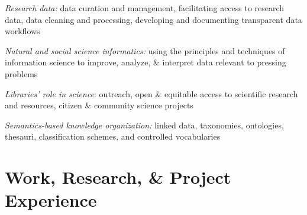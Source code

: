 \documentclass[12pt,letterpaper]{report}
\newcommand{\listitemspace}{0.25em}
\renewenvironment{itemize}
{\begin{list}{}{\setlength{\leftmargin}{0em}
            \setlength{\parskip}{0em}
            \setlength{\itemsep}{\listitemspace}
            \setlength{\parsep}{\listitemspace}}}
{\end{list}}
\begin{document}
\begin{itemize}

	\item \textit{Research data:} data curation and management, facilitating access to research data, data cleaning and processing, developing and documenting transparent data workflows

	\item \textit{Natural and social science informatics:} using the principles and techniques of information science to improve, analyze, \& interpret data relevant to pressing problems

	\item \textit{Libraries' role in science}: outreach, open \& equitable access to scientific research and resources, citizen \& community science projects

	\item \textit{Semantics-based knowledge organization:} linked data, taxonomies, ontologies, thesauri, classification schemes, and controlled vocabularies

\end{itemize}



\section*{Work, Research, \& Project Experience}
\end{document}
